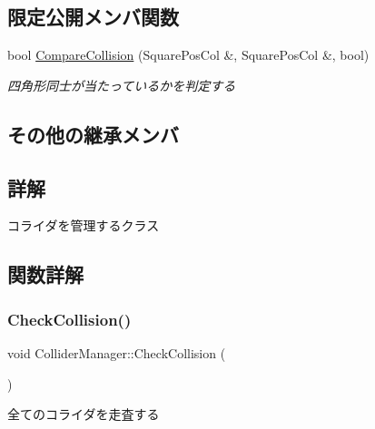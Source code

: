 \subsection*{限定公開メンバ関数}
\begin{DoxyCompactItemize}
\item 
bool \mbox{\hyperlink{class_collider_manager_a4875e1763218249c86a09bbc1ff53720}{Compare\+Collision}} (Square\+Pos\+Col \&, Square\+Pos\+Col \&, bool)
\begin{DoxyCompactList}\small\item\em 四角形同士が当たっているかを判定する \end{DoxyCompactList}\end{DoxyCompactItemize}
\subsection*{その他の継承メンバ}


\subsection{詳解}
コライダを管理するクラス 

\subsection{関数詳解}
\mbox{\label{class_collider_manager_af3863143e206b4c86c8b89dd91ff3c8c}} 
\subsubsection{\texorpdfstring{Check\+Collision()}{CheckCollision()}}
{\footnotesize\ttfamily void Collider\+Manager\+::\+Check\+Collision (\begin{DoxyParamCaption}{ }\end{DoxyParamCaption})}



全てのコライダを走査する 

\mbox{\label{class_collider_manager_a4875e1763218249c86a09bbc1ff53720}} 
